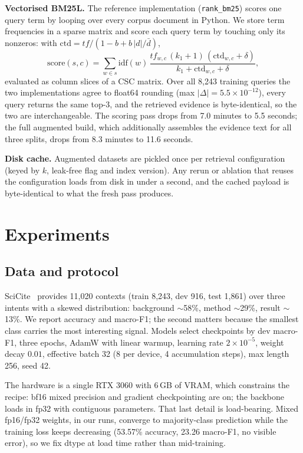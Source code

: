 \documentclass[10pt,twocolumn,twoside]{article}
\begin{document}
\textbf{Vectorised BM25L.} The reference implementation
(\texttt{rank\_bm25}) scores one query term by looping over every corpus
document in Python. We store term frequencies in a sparse matrix and score
each query term by touching only its nonzeros: with
$\mathrm{ctd}=tf/(1-b+b\,|d|/\bar{d})$,
\begin{equation}\label{eq:fast}
\mathrm{score}(s,c)=\sum_{w\in s}\mathrm{idf}(w)\,\frac{tf_{w,c}\,(k_1+1)
\,(\mathrm{ctd}_{w,c}+\delta)}{k_1+\mathrm{ctd}_{w,c}+\delta},
\end{equation}
evaluated as column slices of a CSC matrix. Over all 8{,}243 training queries
the two implementations agree to float64 rounding (max $|\Delta|=5.5\times
10^{-12}$), every query returns the same top-3, and the retrieved evidence is
byte-identical, so the two are interchangeable. The scoring pass drops from
7.0 minutes to 5.5 seconds; the full augmented build, which additionally
assembles the evidence text for all three splits, drops from 8.3 minutes to
11.6 seconds.

\textbf{Disk cache.} Augmented datasets are pickled once per retrieval
configuration (keyed by $k$, leak-free flag and index version). Any rerun or
ablation that reuses the configuration loads from disk in under a second,
and the cached payload is byte-identical to what the fresh pass produces.

\section{Experiments}\label{sec:experiments}

\subsection{Data and protocol}\label{sec:datasets}
SciCite~\cite{cohan2019} provides 11{,}020 contexts (train 8{,}243, dev 916,
test 1{,}861) over three intents with a skewed distribution:
background $\sim$58\%, method $\sim$29\%, result $\sim$13\%. We report
accuracy and macro-F1; the second matters because the smallest class carries
the most interesting signal. Models select checkpoints by dev macro-F1, three
epochs, AdamW with linear warmup, learning rate $2\times10^{-5}$, weight decay
$0.01$, effective batch 32 (8 per device, 4 accumulation steps), max length
256, seed 42.

The hardware is a single RTX 3060 with 6\,GB of VRAM, which constrains the
recipe: bf16 mixed precision and gradient checkpointing are on; the backbone
loads in fp32 with contiguous parameters. That last detail is load-bearing.
Mixed fp16/fp32 weights, in our runs, converge to majority-class prediction
while the training loss keeps decreasing (53.57\% accuracy, 23.26 macro-F1,
no visible error), so we fix dtype at load time rather than mid-training.
\end{document}
